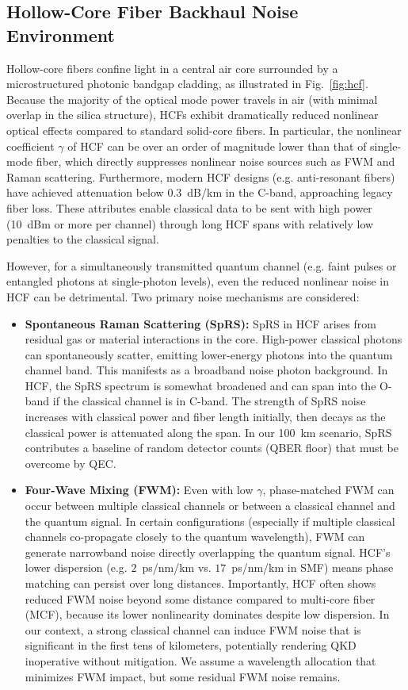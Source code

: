 \documentclass[conference]{IEEEtran}  %
\begin{document}
\subsection{Hollow-Core Fiber Backhaul Noise Environment}
Hollow-core fibers confine light in a central air core surrounded by a microstructured photonic bandgap cladding, as illustrated in Fig.~\ref{fig:hcf}. Because the majority of the optical mode power travels in air (with minimal overlap in the silica structure), HCFs exhibit dramatically reduced nonlinear optical effects compared to standard solid-core fibers. In particular, the nonlinear coefficient $\gamma$ of HCF can be over an order of magnitude lower than that of single-mode fiber, which directly suppresses nonlinear noise sources such as FWM and Raman scattering. Furthermore, modern HCF designs (e.g. anti-resonant fibers) have achieved attenuation below $0.3$~dB/km in the C-band, approaching legacy fiber loss. These attributes enable classical data to be sent with high power (10~dBm or more per channel) through long HCF spans with relatively low penalties to the classical signal.

However, for a simultaneously transmitted quantum channel (e.g. faint pulses or entangled photons at single-photon levels), even the reduced nonlinear noise in HCF can be detrimental. Two primary noise mechanisms are considered:
\begin{itemize}
    \item \textbf{Spontaneous Raman Scattering (SpRS):} SpRS in HCF arises from residual gas or material interactions in the core. High-power classical photons can spontaneously scatter, emitting lower-energy photons into the quantum channel band. This manifests as a broadband noise photon background. In HCF, the SpRS spectrum is somewhat broadened and can span into the O-band if the classical channel is in C-band. The strength of SpRS noise increases with classical power and fiber length initially, then decays as the classical power is attenuated along the span. In our 100~km scenario, SpRS contributes a baseline of random detector counts (QBER floor) that must be overcome by QEC.
    \item \textbf{Four-Wave Mixing (FWM):} Even with low $\gamma$, phase-matched FWM can occur between multiple classical channels or between a classical channel and the quantum signal. In certain configurations (especially if multiple classical channels co-propagate closely to the quantum wavelength), FWM can generate narrowband noise directly overlapping the quantum signal. HCF's lower dispersion (e.g. $2$~ps/nm/km vs. $17$~ps/nm/km in SMF) means phase matching can persist over long distances. Importantly, HCF often shows reduced FWM noise beyond some distance compared to multi-core fiber (MCF), because its lower nonlinearity dominates despite low dispersion. In our context, a strong classical channel can induce FWM noise that is significant in the first tens of kilometers, potentially rendering QKD inoperative without mitigation. We assume a wavelength allocation that minimizes FWM impact, but some residual FWM noise remains.
\end{itemize}
\end{document}
